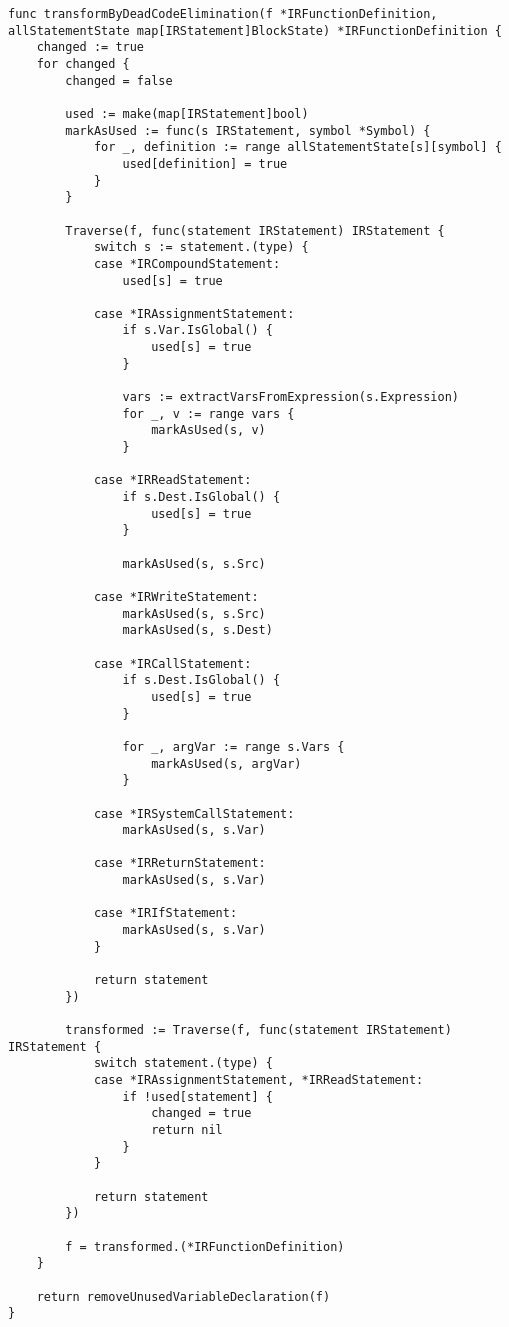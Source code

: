 \documentclass[a4j]{jarticle}
\begin{document}
\begin{verbatim}
func transformByDeadCodeElimination(f *IRFunctionDefinition, allStatementState map[IRStatement]BlockState) *IRFunctionDefinition {
    changed := true
    for changed {
        changed = false

        used := make(map[IRStatement]bool)
        markAsUsed := func(s IRStatement, symbol *Symbol) {
            for _, definition := range allStatementState[s][symbol] {
                used[definition] = true
            }
        }

        Traverse(f, func(statement IRStatement) IRStatement {
            switch s := statement.(type) {
            case *IRCompoundStatement:
                used[s] = true

            case *IRAssignmentStatement:
                if s.Var.IsGlobal() {
                    used[s] = true
                }

                vars := extractVarsFromExpression(s.Expression)
                for _, v := range vars {
                    markAsUsed(s, v)
                }

            case *IRReadStatement:
                if s.Dest.IsGlobal() {
                    used[s] = true
                }

                markAsUsed(s, s.Src)

            case *IRWriteStatement:
                markAsUsed(s, s.Src)
                markAsUsed(s, s.Dest)

            case *IRCallStatement:
                if s.Dest.IsGlobal() {
                    used[s] = true
                }

                for _, argVar := range s.Vars {
                    markAsUsed(s, argVar)
                }

            case *IRSystemCallStatement:
                markAsUsed(s, s.Var)

            case *IRReturnStatement:
                markAsUsed(s, s.Var)

            case *IRIfStatement:
                markAsUsed(s, s.Var)
            }

            return statement
        })

        transformed := Traverse(f, func(statement IRStatement) IRStatement {
            switch statement.(type) {
            case *IRAssignmentStatement, *IRReadStatement:
                if !used[statement] {
                    changed = true
                    return nil
                }
            }

            return statement
        })

        f = transformed.(*IRFunctionDefinition)
    }

    return removeUnusedVariableDeclaration(f)
}
\end{verbatim}
\end{document}
